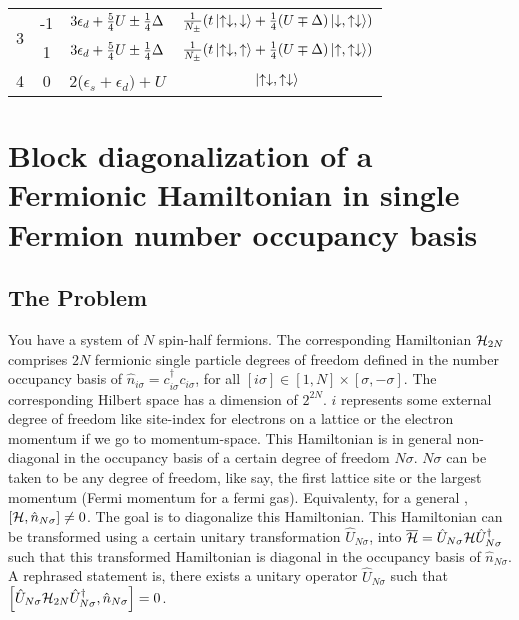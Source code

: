 \documentclass[12pt]{article}
\newcommand{\un}{\ensuremath{\hat{U}_{N\sigma}}}
\newcommand{\no}{\ensuremath{\hat{n}_{N\sigma}}}
\newcommand{\hml}{\ensuremath{\ham_{2N}}}
\begin{document}
\begin{center}
\begin{tabular}{@{}cccc@{}}
                                        \toprule

\multirow{2}{*}{3} & -1 & \(3\epsilon_d + \frac{5}{4}U \pm \frac{1}{4}\Delta\)  & \(\frac{1}{N_\pm}(t\ket{\uparrow\downarrow,\downarrow}+\frac{1}{4}(U\mp\Delta)\ket{\downarrow,\uparrow\downarrow})\) \\

 \cmidrule(l){2-4}

& 1 & \(3\epsilon_d + \frac{5}{4}U \pm \frac{1}{4}\Delta\)  & \(\frac{1}{N_\pm}(t\ket{\uparrow\downarrow,\uparrow}+\frac{1}{4}(U\mp\Delta)\ket{\uparrow,\uparrow\downarrow})\) \\
 \toprule

4                                      & 0                   & 2(\(\epsilon_s+\epsilon_d)+U\)  & \(\ket{\uparrow\downarrow,\uparrow\downarrow}\) \\
\toprule
\end{tabular}
\end{center}

\section{Block diagonalization of a Fermionic Hamiltonian in single Fermion number occupancy basis}
\subsection{The Problem} You have a system of \(N\) spin-half fermions. The corresponding Hamiltonian \(\hml\) comprises \(2N\) fermionic single particle degrees of freedom defined in the number occupancy basis of \(\hat{n}_{i\sigma} = c^\dagger_{i\sigma}c_{i\sigma}\), for all \([i\sigma]\in[1,N]\times[\sigma,-\sigma]\). The corresponding Hilbert space has a dimension of \(2^{2N}\). \(i\) represents some external degree of freedom like site-index for electrons on a lattice or the electron momentum if we go to momentum-space. This Hamiltonian is in general non-diagonal in the occupancy basis of a certain degree of freedom \(N\sigma\). \(N\sigma\) can be taken to be any degree of freedom, like say, the first lattice site or the largest momentum (Fermi momentum for a fermi gas). Equivalenty, for a general \ham, \(\left[{\mathcal{H}, \hat{n}_{N\sigma}}\right]\neq 0\). The goal is to diagonalize this Hamiltonian. 
\btm
This Hamiltonian can be transformed using a certain unitary transformation \un, into \(\overline{\ham} = \un \ham \un^\dagger\) such that this transformed Hamiltonian is diagonal in the occupancy basis of \(\hat{n}_{N\sigma}\). A rephrased statement is, there exists a unitary operator \(\un\) such that \(\qq{\un \hml \un^\dagger, \no}=0\).
\etm
\end{document}
